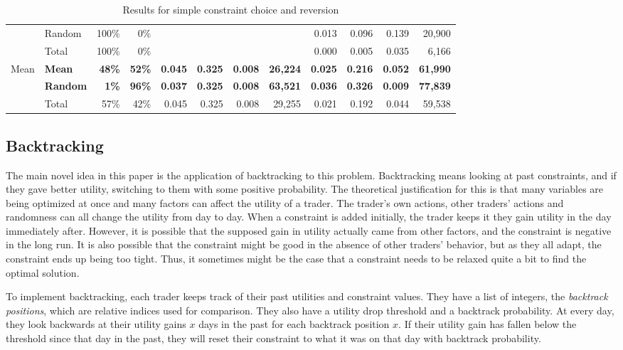 \documentclass[12pt,a4paper,titlepage]{article}
\begin{document}
\begin{table}
\begin{tabular}{ll|rr|rrrr|rrrr}
    \multicolumn{ 1}{l}{} & Random & 100\% & 0\% &  &  &  &  & 0.013 & 0.096 & 0.139 & 20,900 \\
    \multicolumn{ 1}{l}{} & Total & 100\% & 0\% &  &  &  &  & 0.000 & 0.005 & 0.035 & 6,166 \\
    \multicolumn{ 1}{l}{Mean} & \textbf{Mean} & \textbf{48\%} & \textbf{52\%} & \textbf{0.045} & \textbf{0.325} & \textbf{0.008} & \textbf{26,224} & \textbf{0.025} & \textbf{0.216} & \textbf{0.052} & \textbf{61,990} \\
    \multicolumn{ 1}{l}{} & \textbf{Random} & \textbf{1\%} & \textbf{96\%} & \textbf{0.037} & \textbf{0.325} & \textbf{0.008} & \textbf{63,521} & \textbf{0.036} & \textbf{0.326} & \textbf{0.009} & \textbf{77,839} \\
    \multicolumn{ 1}{l}{} & Total & 57\% & 42\% & 0.045 & 0.325 & 0.008 & 29,255 & 0.021 & 0.192 & 0.044 & 59,538 \\
  \end{tabular}
\caption{Results for simple constraint choice and reversion}
\label{tab:simple}
\end{table}


\subsection{Backtracking}\label{backtrack}

The main novel idea in this paper is the application of backtracking to this problem.
Backtracking means looking at past constraints, and if they gave better utility, switching to them with some positive probability.
The theoretical justification for this is that many variables are being optimized at once and many factors can affect the utility of a trader.
The trader's own actions, other traders' actions and randomness can all change the utility from day to day.
When a constraint is added initially, the trader keeps it they gain utility in the day immediately after.
However, it is possible that the supposed gain in utility actually came from other factors, and the constraint is negative in the long run.
It is also possible that the constraint might be good in the absence of other traders' behavior, but as they all adapt, the constraint ends up being too tight.
Thus, it sometimes might be the case that a constraint needs to be relaxed quite a bit to find the optimal solution.

To implement backtracking, each trader keeps track of their past utilities and constraint values.
They have a list of integers, the \textit{backtrack positions}, which are relative indices used for comparison.
They also have a utility drop threshold and a backtrack probability.
At every day, they look backwards at their utility gains $x$ days in the past for each backtrack position $x$.
If their utility gain has fallen below the threshold since that day in the past, they will reset their constraint to what it was on that day with backtrack probability.
\end{document}
